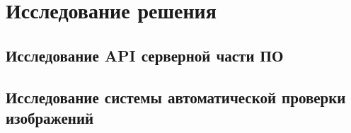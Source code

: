 
\section{Исследование решения}

\subsection{Исследование API серверной части ПО}

\subsection{Исследование системы автоматической проверки изображений}
